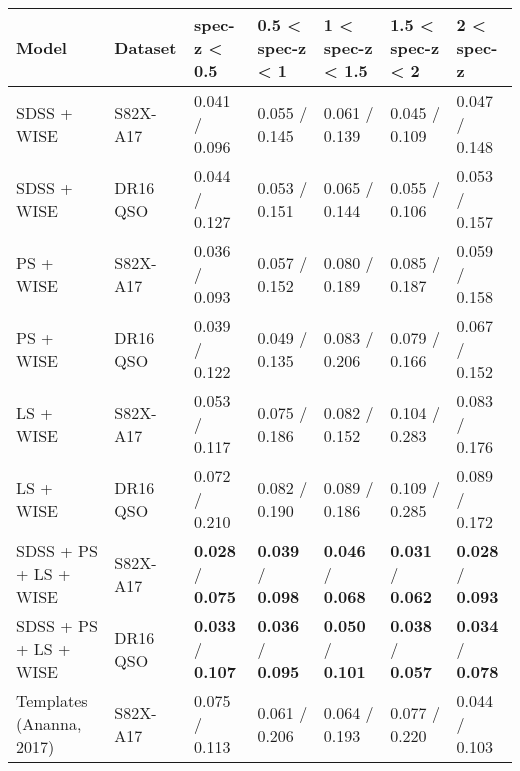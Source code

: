 \begin{table*}
    \centering
    \begin{tabular}{lllllll}
    \hline
                        Model &   Dataset &                     spec-z < 0.5 &                 0.5 < spec-z < 1 &                 1 < spec-z < 1.5 &                 1.5 < spec-z < 2 &                       2 < spec-z \\
    \hline
                  SDSS + WISE &  S82X-A17 &                    0.041 / 0.096 &                    0.055 / 0.145 &                    0.061 / 0.139 &                    0.045 / 0.109 &                    0.047 / 0.148 \\
                  SDSS + WISE &  DR16 QSO &                    0.044 / 0.127 &                    0.053 / 0.151 &                    0.065 / 0.144 &                    0.055 / 0.106 &                    0.053 / 0.157 \\
                    PS + WISE &  S82X-A17 &                    0.036 / 0.093 &                    0.057 / 0.152 &                    0.080 / 0.189 &                    0.085 / 0.187 &                    0.059 / 0.158 \\
                    PS + WISE &  DR16 QSO &                    0.039 / 0.122 &                    0.049 / 0.135 &                    0.083 / 0.206 &                    0.079 / 0.166 &                    0.067 / 0.152 \\
                    LS + WISE &  S82X-A17 &                    0.053 / 0.117 &                    0.075 / 0.186 &                    0.082 / 0.152 &                    0.104 / 0.283 &                    0.083 / 0.176 \\
                    LS + WISE &  DR16 QSO &                    0.072 / 0.210 &                    0.082 / 0.190 &                    0.089 / 0.186 &                    0.109 / 0.285 &                    0.089 / 0.172 \\
        SDSS + PS + LS + WISE &  S82X-A17 &  \textbf{0.028} / \textbf{0.075} &  \textbf{0.039} / \textbf{0.098} &  \textbf{0.046} / \textbf{0.068} &  \textbf{0.031} / \textbf{0.062} &  \textbf{0.028} / \textbf{0.093} \\
        SDSS + PS + LS + WISE &  DR16 QSO &  \textbf{0.033} / \textbf{0.107} &  \textbf{0.036} / \textbf{0.095} &  \textbf{0.050} / \textbf{0.101} &  \textbf{0.038} / \textbf{0.057} &  \textbf{0.034} / \textbf{0.078} \\
     Templates (Ananna, 2017) &  S82X-A17 &                    0.075 / 0.113 &                    0.061 / 0.206 &                    0.064 / 0.193 &                    0.077 / 0.220 &                    0.044 / 0.103 \\

\end{tabular}
\end{table*}
